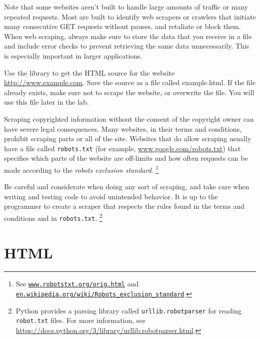 Note that some websites aren't built to handle large amounts of traffic or many repeated requests.
Most are built to identify web scrapers or crawlers that initiate many consecutive GET requests without pauses, and retaliate or block them.
When web scraping, always make sure to store the data that you receive in a file and include error checks to prevent retrieving the same data unnecessarily.
This is especially important in larger applications.

\begin{problem}
Use the  library to get the HTML source for the website \url{http://www.example.com}.
Save the source as a file called example.html.
If the file already exists, make sure not to scrape the website, or overwrite the file.
You will use this file later in the lab.
\label{prob:get-example.com}
\end{problem}

\begin{warn} %
Scraping copyrighted information without the consent of the copyright owner can have severe legal consequences.
Many websites, in their terms and conditions, prohibit scraping parts or all of the site.
Websites that do allow scraping usually have a file called \texttt{robots.txt} (for example, \url{www.google.com/robots.txt}) that specifies which parts of the website are off-limits and how often requests can be made according to the \emph{robots exclusion standard}.%
\footnote{See \href{http://www.robotstxt.org/orig.html}{\texttt{www.robotstxt.org/orig.html}} and \href{https://en.wikipedia.org/wiki/Robots_exclusion_standard}{\texttt{en.wikipedia.org/wiki/Robots\_exclusion\_standard}}.}

Be careful and considerate when doing any sort of scraping, and take care when writing and testing code to avoid unintended behavior.
It is up to the programmer to create a scraper that respects the rules found in the terms and conditions and in \texttt{robots.txt}.%
\footnote{Python provides a parsing library called \texttt{urllib.robotparser} for reading \texttt{robot.txt} files.
For more information, see \url{https://docs.python.org/3/library/urllib.robotparser.html}.
}
\end{warn}

\section*{HTML} %

